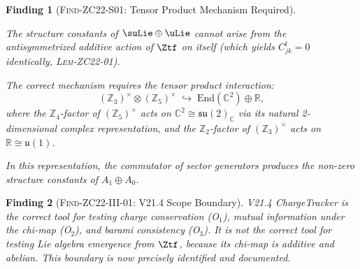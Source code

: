 \documentclass[12pt, a4paper]{article}
\newtheorem{finding}{Finding}[section]
\begin{document}
\begin{finding}[\textsc{Find-ZC22-S01}: Tensor Product Mechanism Required]
\label{zc22:find:tensor}
\begin{derivedbox}[title={FIND-ZC22-S01}]
The structure constants of $\suLie \oplus \uLie$
\emph{cannot} arise from the antisymmetrized additive action
of $\Ztf$ on itself (which yields $C_{jk}^l = 0$ identically,
\textsc{Lem-ZC22-01}).

The correct mechanism requires the \emph{tensor product interaction}:
\begin{equation}
  (\mathbb{Z}_3)^\times \otimes (\mathbb{Z}_5)^\times
  \;\hookrightarrow\;
  \mathrm{End}(\mathbb{C}^2) \oplus \mathbb{R},
  \tag{FIND-ZC22-S01}
\end{equation}
where the $\mathbb{Z}_4$-factor of $(\mathbb{Z}_5)^\times$ acts on
$\mathbb{C}^2 \cong \mathfrak{su}(2)_{\mathbb{C}}$
via its natural 2-dimensional complex representation,
and the $\mathbb{Z}_2$-factor of $(\mathbb{Z}_3)^\times$ acts on
$\mathbb{R} \cong \mathfrak{u}(1)$.

In this representation, the commutator of sector generators
produces the non-zero structure constants of $A_1 \oplus A_0$.
\end{derivedbox}
\end{finding}

\begin{finding}[\textsc{Find-ZC22-III-01}: V21.4 Scope Boundary]
\label{zc22:find:v214-scope}
V21.4 ChargeTracker is the correct tool for testing
charge conservation (O$_1$), mutual information under the chi-map (O$_2$),
and barami consistency (O$_3$).
It is \emph{not} the correct tool for testing
Lie algebra emergence from $\Ztf$,
because its chi-map is additive and abelian.
This boundary is now precisely identified and documented.
\end{finding}
\end{document}

